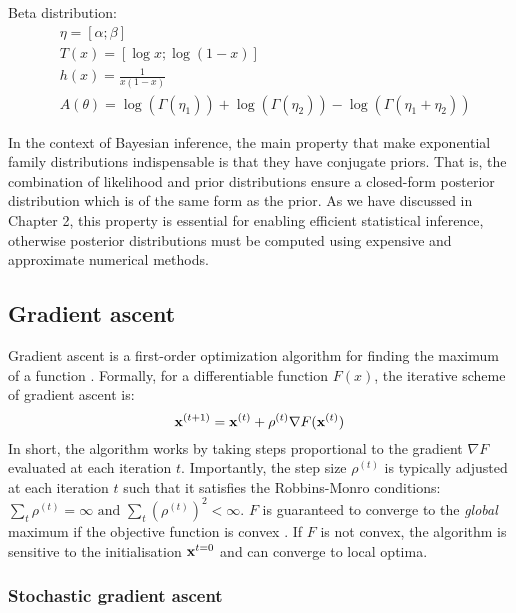 Beta distribution:
\begin{align*}
	& \eta = [\alpha; \beta] \\
	& T(x) = [\log x; \log (1-x)] \\
	& h(x) = \frac{1}{x(1-x)} \\
	& A(\theta) = \log(\Gamma(\eta_1)) +\log(\Gamma(\eta_2)) - \log(\Gamma(\eta_1+\eta_2))
\end{align*}

In the context of Bayesian inference, the main property that make exponential family distributions indispensable is that they have conjugate priors. That is, the combination of likelihood and prior distributions ensure a closed-form posterior distribution which is of the same form as the prior. As we have discussed in Chapter 2, this property is essential for enabling efficient statistical inference, otherwise posterior distributions must be computed using expensive and approximate numerical methods.


\subsection{Gradient ascent} \label{section:gradient_ascent}

Gradient ascent is a first-order optimization algorithm for finding the maximum of a function \cite{Bishop2006,Murphy}. Formally, for a differentiable function $F(x)$, the iterative scheme of gradient ascent is:
\begin{equation} \label{gradient_ascent}
	{\bf x}^{(t+1)} = {\bf x}^{(t)} + \rho^{(t)} \nabla F({\bf x}^{(t)})
\end{equation}
In short, the algorithm works by taking steps proportional to the gradient $\nabla F$ evaluated at each iteration $t$. 
Importantly, the step size $\rho^{(t)}$ is typically adjusted at each iteration $t$ such that it satisfies the Robbins-Monro conditions: $\sum_t \rho^{(t)} = \infty \text{ and } \sum_t (\rho^{(t)})^2 < \infty$. $F$ is guaranteed to converge to the \textit{global} maximum if the objective function is convex \cite{Robbins-Monro1951}. If $F$ is not convex, the algorithm is sensitive to the initialisation ${\bf x}^{t=0}$ and can converge to local optima.


\subsubsection{Stochastic gradient ascent} \label{section:stochastic_gradient_ascent}

